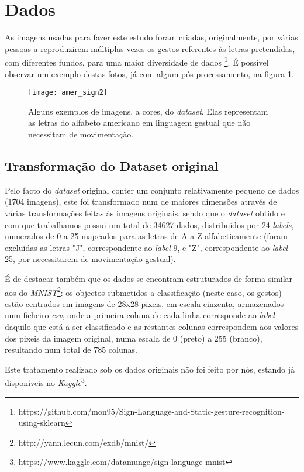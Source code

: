 \section{Dados}
As imagens usadas para fazer este estudo foram criadas, originalmente, por várias pessoas a reproduzirem múltiplas vezes os gestos referentes às letras pretendidas, com diferentes fundos, para uma maior diversidade de dados \footnote{https://github.com/mon95/Sign-Language-and-Static-gesture-recognition-using-sklearn}. É possível observar um exemplo destas fotos, já com algum pós processamento, na figura \ref{fig:data_example}.

\begin{figure}[!b]
	\centering
	\texttt{[image: amer\_sign2]}
	\caption{Alguns exemplos de imagens, a cores, do \textit{dataset}. Elas representam as letras do alfabeto americano em linguagem 	gestual que não necessitam de movimentação.}
	\label{fig:data_example}
\end{figure}

\subsection{Transformação do Dataset original}
Pelo facto do \textit{dataset} original conter um conjunto relativamente pequeno de dados (1704 imagens), este foi transformado num de maiores dimensões através de várias transformações feitas às imagens originais, sendo que o \textit{dataset} obtido e com que trabalhamos possui um total de 34627 dados, distribuídos por 24 \textit{labels}, numerados de 0 a 25 mapeados para as letras de A a Z alfabeticamente (foram excluídas as letras "J", correspondente ao \textit{label} 9, e "Z", correspondente ao \textit{label} 25, por necessitarem de movimentação gestual). \par
É de destacar também que os dados se encontram estruturados de forma similar aos do \textit{MNIST}\footnote{http://yann.lecun.com/exdb/mnist/}: os objectos submetidos a classificação (neste caso, os gestos) estão centrados em imagens de 28x28 pixeis, em escala cinzenta, armazenados num ficheiro \textit{csv}, onde a primeira coluna de cada linha corresponde ao \textit{label} daquilo que está a ser classificado e as restantes colunas correspondem aos valores dos pixeis da imagem original, numa escala de 0 (preto) a 255 (branco), resultando num total de 785 colunas. \par
Este tratamento realizado sob os dados originais não foi feito por nós, estando já disponíveis no \textit{Kaggle}\footnote{https://www.kaggle.com/datamunge/sign-language-mnist}.

